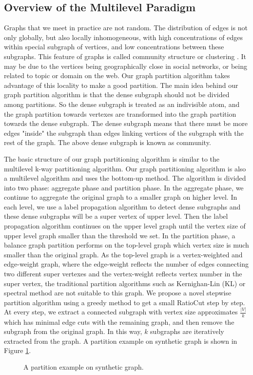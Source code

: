 \documentclass{acm_proc_article-sp}
\begin{document}
\subsection{Overview of the Multilevel Paradigm}
Graphs that we meet in practice are not random. The distribution of edges is not only globally, but also locally inhomogeneous, with high concentrations of edges within special subgraph of vertices, and low concentrations between these subgraphs. This feature of graphs is called community structure or clustering \cite{gn:community}. It may be due to the vertices being geographically close in social networks, or being related to topic or domain on the web. Our graph partition algorithm takes advantage of this locality to make a good partition. The main idea behind our graph partition algorithm is that the dense subgraph should not be divided among partitions. So the dense subgraph is treated as an indivisible atom, and the graph partition towards vertexes are transformed into the graph partition towards the dense subgraph. The dense subgraph means that there must be more edges "inside" the subgraph than edges linking vertices of the subgraph with the rest of the graph. The above dense subgraph is known as community.
\par
The basic structure of our graph partitioning algorithm is similar to the multilevel k-way partitioning algorithm. Our graph partitioning algorithm is also a multilevel algorithm and uses the bottom-up method. The algorithm is divided into two phase: aggregate phase and partition phase. In the aggregate phase, we continue to aggregate the original graph to a smaller graph on higher level. In each level, we use a label propagation algorithm to detect dense subgraphs and these dense subgraphs will be a super vertex of upper level. Then the label propagation algorithm continues on the upper level graph until the vertex size of upper level graph smaller than the threshold we set. In the partition phase, a balance graph partition performs on the top-level graph which vertex size is much smaller than the original graph. As the top-level graph is a vertex-weighted and edge-weight graph, where the edge-weight reflects the number of edges connecting two different super vertexes and the vertex-weight reflects vertex number in the super vertex, the traditional partition algorithms such as Kernighan-Lin (KL) or spectral method are not suitable to this graph\cite{kl:partition, barnard:mrsb}. We propose a novel stepwise partition algorithm using a greedy method to get a small RatioCut step by step. At every step, we extract a connected subgraph with vertex size approximates $\frac{|V|}{k}$ which has minimal edge cuts with the remaining graph, and then remove the subgraph from the original graph. In this way, $k$ subgraphs are iteratively extracted from the graph. A partition example on synthetic graph is shown in Figure \ref{fig:partition example}.
\begin{figure}
\centering
{}
\caption{A partition example on synthetic graph.}
\label{fig:partition example}
\end{figure}
\end{document}
